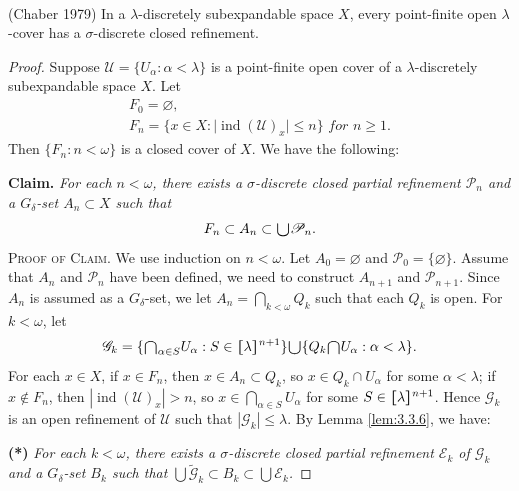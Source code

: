 \documentclass[ch3.tex]{subfiles}
\begin{document}
{\theorem{\label{th:3.3.7}}  
\textup{(\hstretch{1.8}{[}Chaber 1979\hstretch{1.8}{]}\textsuperscript{\cite{Chaber}})}
In a $\lambda$-discretely subexpandable space $X$, every point-finite open $\lambda$-cover has a $\sigma$-discrete closed refinement.
}

\begin{proof}
Suppose $\mathscr{U} = \{U_\alpha:  \alpha < \lambda\}$ is a point-finite open cover of a $\lambda$-discretely 
subexpandable space $X$. Let 
\begin{gather*}
	F_0 = \varnothing,\\
	F_n = \{x \in X:  \vert{}\operatorname{ind}(\mathscr{U})_x\vert{} \le n\} \textit{ for } n\ge 1.
\end{gather*}
Then $\{F_n: n < \omega\}$ is a closed cover of $X$. We have the following:

\textbf{Claim.} \textit{For each $n < \omega$, there exists a $\sigma$-discrete closed partial refinement $\mathscr{P}_n$ and a $G_\delta$-set $A_n \subset X$ such that}
$$F_n \subset A_n \subset \raisebox{-2pt}{\scalebox{1.5}{$\cup$}} \mathscr{P}_n.$$
\textsc{Proof of Claim}. We use induction on $n < \omega$. 
Let $A_0 = \varnothing$ and $\mathscr{P}_0 = \{\varnothing\}$. 
Assume that $A_n$ and $\mathscr{P}_n$ have been defined,
we need to construct $A_{n+1}$ and $\mathscr{P}_{n+1}$. Since $A_n$ is assumed as a $G_\delta$-set, 
we let $A_n = \bigcap_{k < \omega} Q_k$ such that each $Q_k$ is open. 
For $k < \omega$, let
$$\mathscr{G}_k = \{ \raisebox{-2pt}{\scalebox{1.5}{$\cap$}}_{\alpha\in S}U_\alpha: S\in\hstretch{1.8}{[}\lambda\hstretch{1.8}{]}^{n+1} \}
\raisebox{-2pt}{\scalebox{1.5}{$\cup$}} \{Q_k\raisebox{-2pt}{\scalebox{1.5}{$\cap$}} U_\alpha: \alpha < \lambda\}.$$
For each $x \in X$, if $x \in F_n$, then $x \in A_n \subset Q_k$, 
so $x \in Q_k\cap U_\alpha$ for some $\alpha < \lambda$; if $x \notin F_n$, 
then $|\operatorname{ind}(\mathscr{U})_x| > n$,
so $x\in \bigcap_{\alpha\in S} U_\alpha$ for some 
$S\in \hstretch{1.8}{[}\lambda\hstretch{1.8}{]}^{n+1}$. Hence
$\mathscr{G}_k$ is an open refinement of $\mathscr{U}$ such that  
$|\mathscr{G}_k| \le \lambda$.
By Lemma \ref{lem:3.3.6}, we have:

\textbf{(*)} 
\textit{For each $k < \omega$, there exists a $\sigma$-discrete closed partial refinement 
$\mathscr{E}_k$ of $\mathscr{G}_k$ and a $G_\delta$-set $B_k$ such that 
$\bigcup \widetilde{\mathscr{G}}_k \subset B_k \subset \bigcup \mathscr{E}_k$.}


\end{proof}
\end{document}
